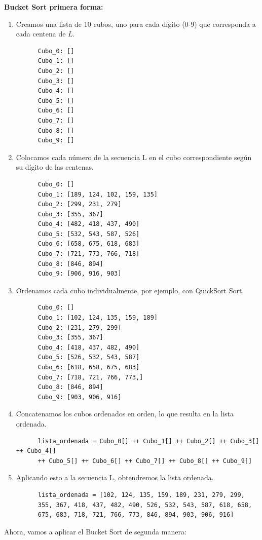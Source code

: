 \documentclass[answers, 11pt]{exam}
\begin{document}
\begin{questions}
\begin{solution}
  \textbf{Bucket Sort primera forma:}
  \begin{enumerate}
    \item Creamos una lista de 10 cubos, uno para cada dígito (0-9) que corresponda a cada centena de $L$.
    \begin{verbatim}
      Cubo_0: []
      Cubo_1: []
      Cubo_2: []
      Cubo_3: []
      Cubo_4: []
      Cubo_5: []
      Cubo_6: []
      Cubo_7: []
      Cubo_8: []
      Cubo_9: []
    \end{verbatim}
    \item Colocamos cada número de la secuencia L en el cubo correspondiente según su dígito de las centenas.
    \begin{verbatim}
      Cubo_0: []
      Cubo_1: [189, 124, 102, 159, 135]
      Cubo_2: [299, 231, 279]
      Cubo_3: [355, 367]
      Cubo_4: [482, 418, 437, 490]
      Cubo_5: [532, 543, 587, 526]
      Cubo_6: [658, 675, 618, 683]
      Cubo_7: [721, 773, 766, 718]
      Cubo_8: [846, 894]
      Cubo_9: [906, 916, 903]
    \end{verbatim}
    \item Ordenamos cada cubo individualmente, por ejemplo, con QuickSort Sort.
    \begin{verbatim}
      Cubo_0: []
      Cubo_1: [102, 124, 135, 159, 189]
      Cubo_2: [231, 279, 299]
      Cubo_3: [355, 367]
      Cubo_4: [418, 437, 482, 490]
      Cubo_5: [526, 532, 543, 587]
      Cubo_6: [618, 658, 675, 683]
      Cubo_7: [718, 721, 766, 773,]
      Cubo_8: [846, 894]
      Cubo_9: [903, 906, 916]
    \end{verbatim}
    \item Concatenamos los cubos ordenados en orden, lo que resulta en la lista ordenada.
    \begin{verbatim}
      lista_ordenada = Cubo_0[] ++ Cubo_1[] ++ Cubo_2[] ++ Cubo_3[] ++ Cubo_4[] 
      ++ Cubo_5[] ++ Cubo_6[] ++ Cubo_7[] ++ Cubo_8[] ++ Cubo_9[]
    \end{verbatim}
    \item Aplicando esto a la secuencia L, obtendremos la lista ordenada.
    \begin{verbatim}
      lista_ordenada = [102, 124, 135, 159, 189, 231, 279, 299,
      355, 367, 418, 437, 482, 490, 526, 532, 543, 587, 618, 658,
      675, 683, 718, 721, 766, 773, 846, 894, 903, 906, 916]
    \end{verbatim}
  \end{enumerate}

  Ahora, vamos a aplicar el Bucket Sort de segunda manera:
  

\end{solution}
\end{questions}
\end{document}
